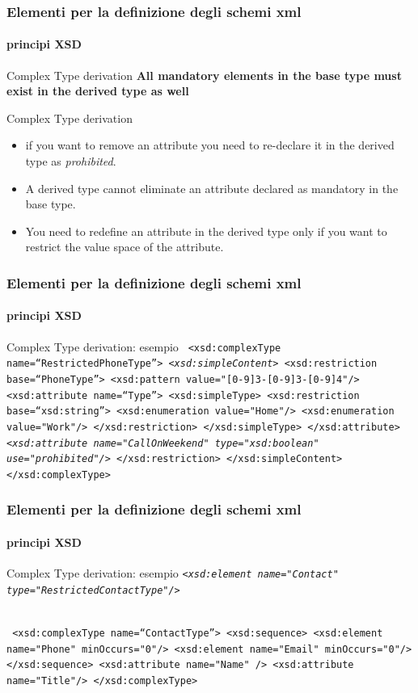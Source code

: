 \begin{frame}
	\frametitle{Elementi per la definizione degli schemi xml}
	\framesubtitle{principi XSD}
	\addtocounter{nframe}{1}

	\begin{block}{Complex Type derivation}
		\textbf{All mandatory elements in the base type must exist in the derived type as well}
	\end{block}

	\begin{block}{Complex Type derivation}
		\begin{itemize}
			\item if you want to remove an attribute you need to re-declare it in the derived type as \textit{prohibited}.
			\item A derived type cannot eliminate an attribute declared as mandatory in the base type.
			\item You need to redefine an attribute in the derived type only if you want to restrict the value space of the attribute.
		\end{itemize}
	\end{block}
\end{frame}



\begin{frame}
	\frametitle{Elementi per la definizione degli schemi xml}
	\framesubtitle{principi XSD}
	\addtocounter{nframe}{1}

	\begin{block}{Complex Type derivation: esempio}
		\texttt{
		<xsd:complexType name=``RestrictedPhoneType''>
		\emph{<xsd:simpleContent>}
		<xsd:restriction base=``PhoneType''>
		<xsd:pattern value="[0-9]{3}-[0-9]{3}-[0-9]{4}"/>
		<xsd:attribute name=``Type''>
		<xsd:simpleType>
		<xsd:restriction base=``xsd:string''>
		<xsd:enumeration value="Home"/>
		<xsd:enumeration value="Work"/>
		</xsd:restriction>
		</xsd:simpleType>
		</xsd:attribute>
		\textit{<xsd:attribute name="CallOnWeekend" type="xsd:boolean" use="prohibited"/> }
		</xsd:restriction>
		</xsd:simpleContent>
		</xsd:complexType>
		}
	\end{block}
\end{frame}

\begin{frame}
	\frametitle{Elementi per la definizione degli schemi xml}
	\framesubtitle{principi XSD}
	\addtocounter{nframe}{1}

	\begin{block}{Complex Type derivation: esempio}
		\texttt{\emph{<xsd:element name="Contact" type="RestrictedContactType"/>}}

		\\\texttt{   <xsd:complexType name=``ContactType''>
			<xsd:sequence>
			<xsd:element name="Phone" minOccurs="0"/>
			<xsd:element name="Email" minOccurs="0"/>
			</xsd:sequence>
			<xsd:attribute name="Name" />
			<xsd:attribute name="Title"/>
			</xsd:complexType>}
	\end{block}
\end{frame}

